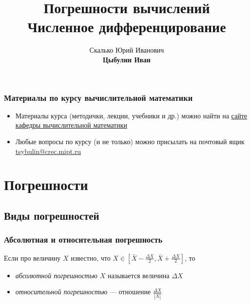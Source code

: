 \documentclass[aspectratio=43,unicode]{beamer}
\title[Погрешности. Дифференцирование]{Погрешности вычислений\\Численное дифференцирование}
\author[Цыбулин Иван]{\texorpdfstring{Скалько Юрий Иванович\\\textbf{Цыбулин
Иван}}{Цыбулин Иван}}
\date{}
\newcommand{\colorhref}[2]{\href{#1}{\textcolor{miptbase!30!black}{#2}}}
\begin{document}
\begin{frame}[plain]
  \titlepage %
\end{frame}

\section{}
\subsection{}

\begin{frame}
	\frametitle{Материалы по курсу вычислительной математики}
	\begin{itemize}
		\item Материалы курса (методички, лекции, учебники и др.) можно найти
			на \colorhref{http://crec.mipt.ru/study/materials/compmath/}
			{сайте кафедры вычислительной математики}
		\item
		Любые вопросы по курсу (и не только) можно присылать на почтовый ящик
		\colorhref{mailto:tsybulin@crec.mipt.ru}{tsybulin@crec.mipt.ru}
\end{itemize}
\end{frame}

\section{Погрешности}
\subsection{Виды погрешностей}
\begin{frame}
\frametitle{Абсолютная и относительная погрешность}
Если про величину $X$ известно, что $X \in [\bar{X}-\frac{\Delta X}{2}, \bar{X}+\frac{\Delta X}{2}]$, то
\begin{itemize}
	\item \emph{абсолютной погрешностью} $X$ называется величина $\Delta X$
	\item \emph{относительной погрешностью} --- отношение $\frac{\Delta X}{\left|\bar{X}\right|}$
\end{itemize}
\end{frame}
\end{document}
